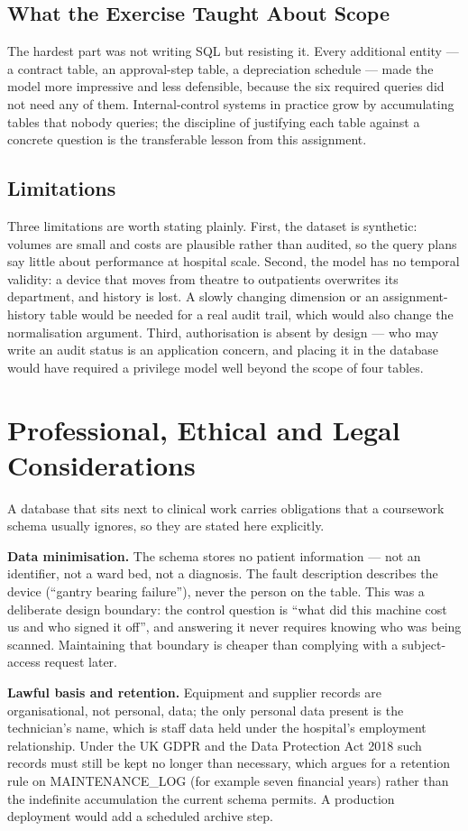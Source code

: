 \documentclass[conference]{IEEEtran}
\begin{document}
\subsection{What the Exercise Taught About Scope}
The hardest part was not writing SQL but resisting it. Every additional
entity --- a contract table, an approval-step table, a depreciation schedule
--- made the model more impressive and less defensible, because the six
required queries did not need any of them. Internal-control systems in
practice grow by accumulating tables that nobody queries; the discipline of
justifying each table against a concrete question is the transferable lesson
from this assignment.

\subsection{Limitations}
Three limitations are worth stating plainly. First, the dataset is synthetic:
volumes are small and costs are plausible rather than audited, so the query
plans say little about performance at hospital scale. Second, the model has
no temporal validity: a device that moves from theatre to outpatients
overwrites its department, and history is lost. A slowly changing dimension
or an assignment-history table would be needed for a real audit trail, which
would also change the normalisation argument. Third, authorisation is absent
by design --- who may write an audit status is an application concern, and
placing it in the database would have required a privilege model well beyond
the scope of four tables.

\section{Professional, Ethical and Legal Considerations}
A database that sits next to clinical work carries obligations that a
coursework schema usually ignores, so they are stated here explicitly.

\textbf{Data minimisation.} The schema stores no patient information --- not
an identifier, not a ward bed, not a diagnosis. The fault description
describes the device (``gantry bearing failure''), never the person on the
table. This was a deliberate design boundary: the control question is
``what did this machine cost us and who signed it off'', and answering it
never requires knowing who was being scanned. Maintaining that boundary is
cheaper than complying with a subject-access request later.

\textbf{Lawful basis and retention.} Equipment and supplier records are
organisational, not personal, data; the only personal data present is the
technician's name, which is staff data held under the hospital's employment
relationship. Under the UK GDPR and the Data Protection Act 2018 such records
must still be kept no longer than necessary, which argues for a retention rule
on MAINTENANCE\_LOG (for example seven financial years) rather than the
indefinite accumulation the current schema permits. A production deployment
would add a scheduled archive step.
\end{document}
